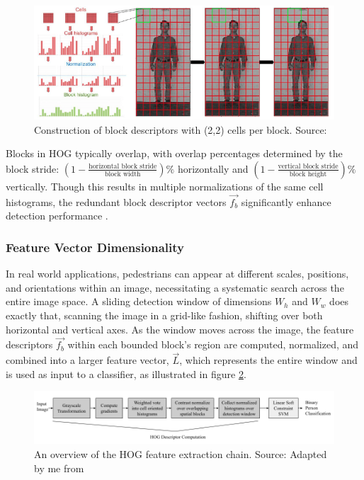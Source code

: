 \begin{figure}
    \centering
    \includegraphics[width=0.75\linewidth]{images/normalisation.png}
    \caption{Construction of block descriptors with (2,2) cells per block. Source: \cite{shidlovskiy_2020_reducing}}
    \label{fig:normalisation}
\end{figure}

Blocks in HOG typically overlap, with overlap percentages determined by the block stride: $(1-\frac{\text{horizontal block stride}}{\text{block width}})\%$ horizontally and $(1-\frac{\text{vertical block stride}}{\text{block height}})\%$ vertically. Though this results in multiple normalizations of the same cell histograms, the redundant block descriptor vectors $\vec{f_b}$ significantly enhance detection performance \cite{dalal_2005_histograms}.

\subsubsection{Feature Vector Dimensionality}\label{sec:feature_vector_dimensionality}

In real world applications, pedestrians can appear at different scales, positions, and orientations within an image, necessitating a systematic search across the entire image space. A sliding detection window of dimensions $W_h$ and $W_w$ does exactly that, scanning the image in a grid-like fashion, shifting over both horizontal and vertical axes. As the window moves across the image, the feature descriptors $\vec{f_b}$ within each bounded block's region are computed, normalized, and combined into a larger feature vector, $\vec{L}$, which represents the entire window and is used as input to a classifier, as illustrated in figure \ref{fig:hog_pipeline}. 

\begin{figure}
    \centering
    \includegraphics[width=1\linewidth]{images/HOG Pipeline.png}
    \caption{An overview of the HOG feature extraction chain. Source: Adapted by me from \cite{dalal_2005_histograms}}
    \label{fig:hog_pipeline}
\end{figure}

